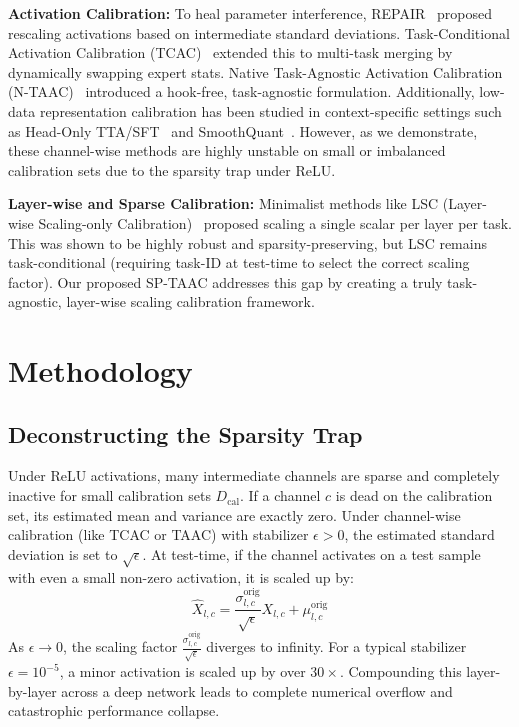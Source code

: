 \documentclass{article}
\theoremstyle{plain}
\theoremstyle{definition}
\theoremstyle{remark}
\begin{document}
\textbf{Activation Calibration:} To heal parameter interference, REPAIR~\cite{jordan2023repair} proposed rescaling activations based on intermediate standard deviations. Task-Conditional Activation Calibration (TCAC)~\cite{tcac2025} extended this to multi-task merging by dynamically swapping expert stats. Native Task-Agnostic Activation Calibration (N-TAAC)~\cite{tcac2025} introduced a hook-free, task-agnostic formulation. Additionally, low-data representation calibration has been studied in context-specific settings such as Head-Only TTA/SFT~\cite{headonly2026} and SmoothQuant~\cite{smoothquant2023}. However, as we demonstrate, these channel-wise methods are highly unstable on small or imbalanced calibration sets due to the sparsity trap under ReLU.

\textbf{Layer-wise and Sparse Calibration:} Minimalist methods like LSC (Layer-wise Scaling-only Calibration)~\cite{lsc2026} proposed scaling a single scalar per layer per task. This was shown to be highly robust and sparsity-preserving, but LSC remains task-conditional (requiring task-ID at test-time to select the correct scaling factor). Our proposed SP-TAAC addresses this gap by creating a truly task-agnostic, layer-wise scaling calibration framework.

\section{Methodology}
\label{sec:method}

\subsection{Deconstructing the Sparsity Trap}
Under ReLU activations, many intermediate channels are sparse and completely inactive for small calibration sets $D_{\text{cal}}$. If a channel $c$ is dead on the calibration set, its estimated mean and variance are exactly zero. Under channel-wise calibration (like TCAC or TAAC) with stabilizer $\epsilon > 0$, the estimated standard deviation is set to $\sqrt{\epsilon}$. At test-time, if the channel activates on a test sample with even a small non-zero activation, it is scaled up by:
\begin{equation}
\hat{X}_{l,c} = \frac{\sigma_{l,c}^{\text{orig}}}{\sqrt{\epsilon}} X_{l,c} + \mu_{l,c}^{\text{orig}}
\end{equation}
As $\epsilon \to 0$, the scaling factor $\frac{\sigma_{l,c}^{\text{orig}}}{\sqrt{\epsilon}}$ diverges to infinity. For a typical stabilizer $\epsilon = 10^{-5}$, a minor activation is scaled up by over $30\times$. Compounding this layer-by-layer across a deep network leads to complete numerical overflow and catastrophic performance collapse.
\end{document}
